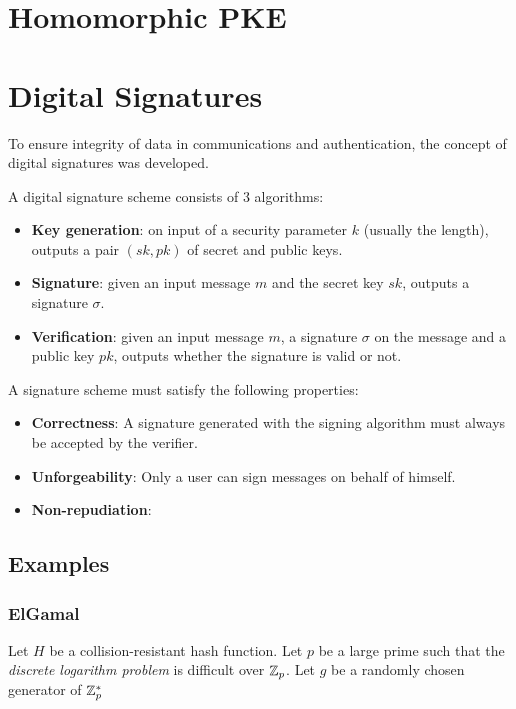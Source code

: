 \newpage

\section{Homomorphic PKE}

\section{Digital Signatures}
To ensure integrity of data in communications and authentication, the concept of digital signatures was developed. 

A digital signature scheme consists of 3 algorithms:
\begin{itemize}
    \item \textbf{Key generation}: on input of a security parameter $k$ (usually the length), outputs a pair $(sk, pk)$ of secret and public keys.
    \item \textbf{Signature}: given an input message $m$ and the secret key $sk$, outputs a signature $\sigma$.
    \item \textbf{Verification}: given an input message $m$, a signature $\sigma$ on the message and a public key $pk$, outputs whether the signature is valid or not.
\end{itemize}

A signature scheme must satisfy the following properties:
\begin{itemize}
    \item \textbf{Correctness}: A signature generated with the signing algorithm must always be accepted by the verifier.
    \item \textbf{Unforgeability}: Only a user can sign messages on behalf of himself.
    \item \textbf{Non-repudiation}: 
\end{itemize}

\subsection{Examples}
\subsubsection*{ElGamal}
\cite{elGamal85}
Let $H$ be a collision-resistant hash function. Let $p$ be a large prime such that the \textit{discrete logarithm problem} is difficult over ${\mathbb Z}_p$. Let $g$ be a randomly chosen generator of ${\mathbb Z}_p^\ast$

